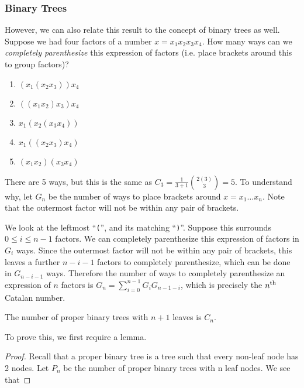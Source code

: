 \subsubsection{Binary Trees}
\noindent However, we can also relate this result to the concept of binary trees as well. Suppose we had four factors of a number $x = x_{1}x_{2}x_{3}x_{4}$. How many ways can we \textit{completely parenthesize} this expression of factors (i.e. place brackets around this to group factors)?
\begin{enumerate}
    \item $(x_{1}(x_{2}x_{3}))x_{4}$
    \item $((x_{1}x_{2})x_{3})x_{4}$
    \item $x_{1}(x_{2}(x_{3}x_{4}))$
    \item $x_{1}((x_{2}x_{3})x_{4})$
    \item $(x_{1}x_{2})(x_{3}x_{4})$
\end{enumerate}
There are 5 ways, but this is the same as $C_3 = \frac{1}{3+1} {2(3) \choose 3} = 5$. To understand why, let $G_{n}$ be the number of ways to place brackets around $x = x_{1}\dots x_{n}$. Note that the outermost factor will not be within any pair of brackets.
\par\null
\noindent We look at the leftmost ``\texttt{(}'', and its matching ``\texttt{)}''. Suppose this surrounds $0 \leq i \leq n-1$ factors. We can completely parenthesize this expression of factors in $G_{i}$ ways. Since the outermost factor will not be within any pair of brackets, this leaves a further $n-i-1$ factors to completely parenthesize, which can be done in $G_{n-i-1}$ ways. Therefore the number of ways to completely parenthesize an expression of $n$ factors is ${G_{n}=\sum_{i=0}^{n-1}G_{i}G_{n-1-i}}$, which is precisely the $n\textsuperscript{th}$ Catalan number.
\begin{theorem}
    The number of proper binary trees with $n+1$ leaves is $C_n$.
\end{theorem}

To prove this, we first require a lemma. 
\begin{proof}
    Recall that a proper binary tree is a tree such that every non-leaf node has 2 nodes. Let $P_n$ be the number of proper binary trees with n leaf nodes. We see that 
\end{proof}